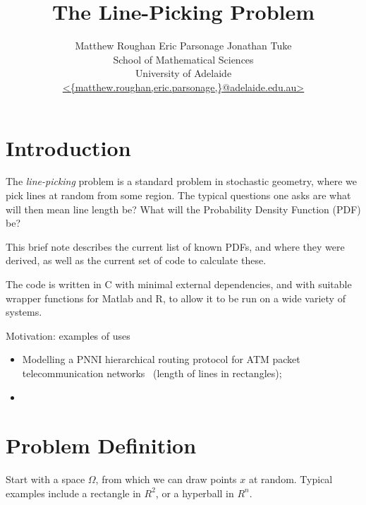 \documentclass{article}
\newcommand{\titlestr}{The Line-Picking Problem}
\begin{document}
\title{\titlestr}
\author{Matthew Roughan \;\;\; Eric Parsonage \;\;\; Jonathan Tuke \\
 School of Mathematical Sciences \\
 University of Adelaide \\
 \url{ <{matthew.roughan,eric.parsonage,}@adelaide.edu.au> } }
\maketitle

\begin{abstract}

\end{abstract}

\section{Introduction}

The {\em line-picking} problem is a standard problem in stochastic
geometry, where we pick lines at random from some region. The typical
questions one asks are what will then mean line length be? What will
the Probability Density Function (PDF) be?

This brief note describes the current list of known PDFs, and where
they were derived, as well as the current set of code to calculate
these. 

The code is written in C with minimal external dependencies, and with
suitable wrapper functions for Matlab and R, to allow it to be run on
a wide variety of systems.



Motivation: examples of uses
\begin{itemize}

\item Modelling a PNNI hierarchical routing protocol for ATM packet
  telecommunication networks~\cite{Rosenberg200499} (length of lines
  in rectangles);

\item 

\end{itemize}

\section{Problem Definition}

Start with a space $\Omega$, from which we can draw points $x$ at
random. Typical examples include a rectangle in $R^2$, or a hyperball
in $R^n$.
\end{document}
